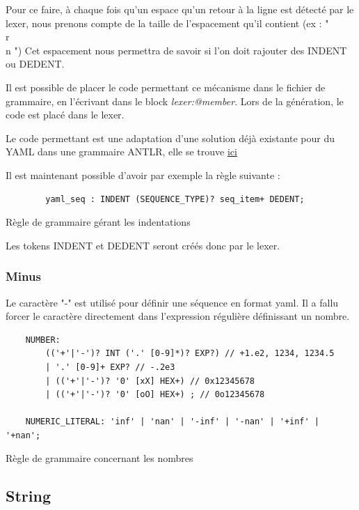 \documentclass[
    iict, %
    il, %
]{heig-tb}
\begin{document}
Pour ce faire, à chaque fois qu'un espace qu'un retour à la ligne est détecté par le lexer, nous prenons compte de la taille de l'espacement qu'il contient (ex : "\\r\\n    ")
Cet espacement nous permettra de savoir si l'on doit rajouter des INDENT ou DEDENT.

Il est possible de placer le code permettant ce mécanisme dans le fichier de grammaire, en l'écrivant dans le block \emph{lexer:@member{}}.
Lors de la génération, le code est placé dans le lexer.

Le code permettant est une adaptation d'une solution déjà existante pour du YAML dans une grammaire ANTLR, elle se trouve \href{https://github.com/umaranis/FastYaml}{ici}

Il est maintenant possible d'avoir par exemple la règle suivante :

\begin{listing}[!ht]
    \begin{verbatim}
        yaml_seq : INDENT (SEQUENCE_TYPE)? seq_item+ DEDENT;
    \end{verbatim}
    \caption{Règle de grammaire gérant les indentations}
    \label{ex-indentation-rule}
\end{listing}

Les tokens INDENT et DEDENT seront créés donc par le lexer.

\subsubsection{Minus}

Le caractère "-" est utilisé pour définir une séquence en format yaml.
Il a fallu forcer le caractère directement dans l'expression régulière définissant un nombre.

\begin{listing}[!ht]
    \begin{verbatim}
    NUMBER:
        (('+'|'-')? INT ('.' [0-9]*)? EXP?) // +1.e2, 1234, 1234.5
        | '.' [0-9]+ EXP? // -.2e3
        | (('+'|'-')? '0' [xX] HEX+) // 0x12345678
        | (('+'|'-')? '0' [oO] HEX+) ; // 0o12345678

    NUMERIC_LITERAL: 'inf' | 'nan' | '-inf' | '-nan' | '+inf' | '+nan';
    \end{verbatim}
    \caption{Règle de grammaire concernant les nombres}
    \label{number-rule}
\end{listing}

\subsection{String}
\end{document}
